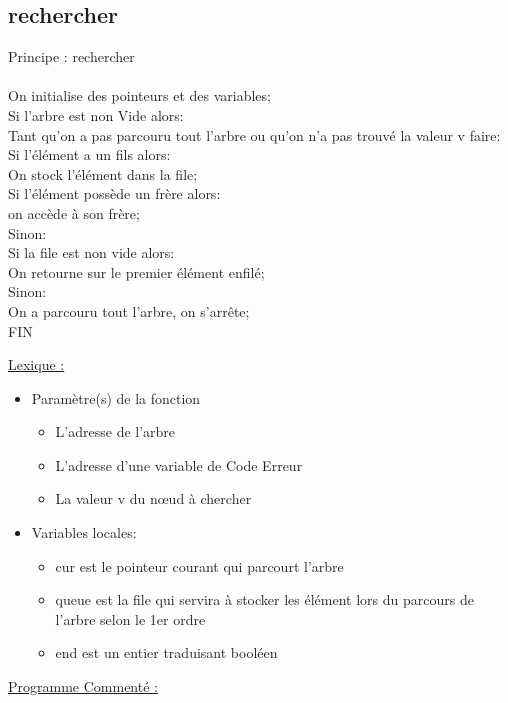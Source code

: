 \documentclass[a4paper]{article}
\newcommand\tab[1][1cm]{\hspace*{#1}}
\begin{document}


\subsection{rechercher}
\begin{algorithm}
Principe : rechercher
\\
\\
\tab On initialise des pointeurs et des variables;
\\
\tab Si l'arbre est non Vide alors:
\\
\tab \tab Tant qu'on a pas parcouru tout l'arbre ou qu'on n'a pas trouvé la valeur v faire:
\\
\tab \tab \tab Si l'élément a un fils alors:
\\
\tab \tab \tab \tab On stock l'élément dans la file;
\\
\tab \tab \tab Si l'élément possède un frère alors:
\\
\tab \tab \tab \tab on accède à son frère;
\\
\tab \tab \tab Sinon:
\\
\tab \tab \tab \tab Si la file est non vide alors:
\\
\tab \tab \tab \tab \tab On retourne sur le premier élément enfilé;
\\
\tab \tab \tab \tab Sinon:
\\
\tab \tab \tab \tab \tab On a parcouru tout l'arbre, on s'arrête;
\\
FIN
\end{algorithm}
\underline{Lexique :}
\begin{itemize}
\item Paramètre(s) de la fonction  
\begin{itemize}
\item L'adresse de l'arbre
\item L'adresse d'une variable de Code Erreur
\item La valeur v du nœud à chercher
\end{itemize}
\item Variables locales:
\begin{itemize}
\item cur est le pointeur courant qui parcourt l'arbre
\item queue est la file qui servira à stocker les élément lors du parcours de l'arbre selon le 1er ordre 
\item end est un entier traduisant booléen
\end{itemize}
\end{itemize}
\underline{Programme Commenté :}
\end{document}
